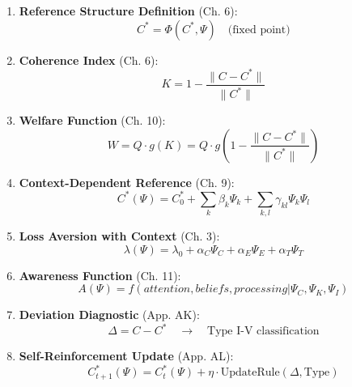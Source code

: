 \begin{enumerate}
    \item \textbf{Reference Structure Definition} (Ch. 6):
    \begin{equation}
        C^* = \Phi(C^*, \Psi) \quad \text{(fixed point)}
    \end{equation}
    
    \item \textbf{Coherence Index} (Ch. 6):
    \begin{equation}
        K = 1 - \frac{\|C - C^*\|}{\|C^*\|}
    \end{equation}
    
    \item \textbf{Welfare Function} (Ch. 10):
    \begin{equation}
        W = Q \cdot g(K) = Q \cdot g\left(1 - \frac{\|C - C^*\|}{\|C^*\|}\right)
    \end{equation}
    
    \item \textbf{Context-Dependent Reference} (Ch. 9):
    \begin{equation}
        C^*(\Psi) = C^*_0 + \sum_k \beta_k \Psi_k + \sum_{k,l} \gamma_{kl} \Psi_k \Psi_l
    \end{equation}
    
    \item \textbf{Loss Aversion with Context} (Ch. 3):
    \begin{equation}
        \lambda(\Psi) = \lambda_0 + \alpha_C \Psi_C + \alpha_E \Psi_E + \alpha_T \Psi_T
    \end{equation}
    
    \item \textbf{Awareness Function} (Ch. 11):
    \begin{equation}
        A(\Psi) = f(attention, beliefs, processing | \Psi_C, \Psi_K, \Psi_I)
    \end{equation}
    
    \item \textbf{Deviation Diagnostic} (App. AK):
    \begin{equation}
        \Delta = C - C^* \quad \rightarrow \quad \text{Type I-V classification}
    \end{equation}
    
    \item \textbf{Self-Reinforcement Update} (App. AL):
    \begin{equation}
        C^*_{t+1}(\Psi) = C^*_t(\Psi) + \eta \cdot \text{UpdateRule}(\Delta, \text{Type})
    \end{equation}
\end{enumerate}

